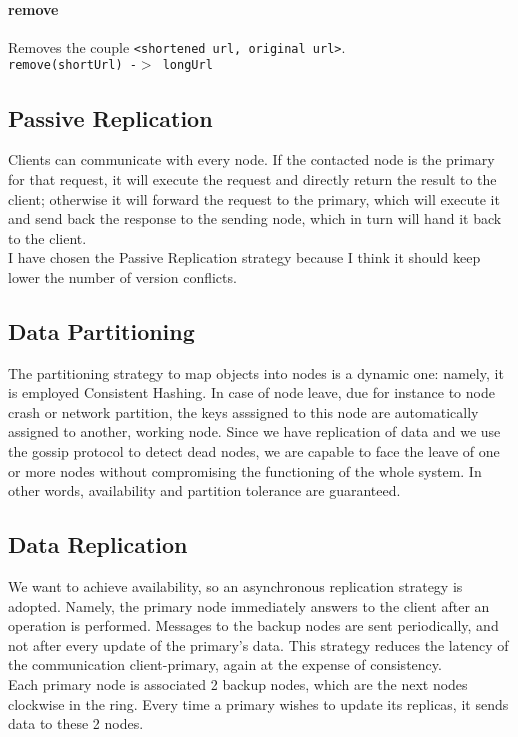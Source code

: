 \documentclass{article}
\begin{document}
\paragraph{remove}
Removes the couple \texttt{<shortened url, original url>}.\\
\texttt{remove(shortUrl) -$>$  longUrl}


\subsection{Passive Replication}
Clients can communicate with every node. If the contacted node is the primary for that request, it will execute the request and directly return the result to the client; otherwise it will forward the request to the primary, which will execute it and send back the response to the sending node, which in turn will hand it back to the client. \\

I have chosen the Passive Replication strategy because I think it should keep lower the number of version conflicts.

\subsection{Data Partitioning}
The partitioning strategy to map objects into nodes is a dynamic one: namely, it is employed Consistent Hashing. In case of node leave, due for instance to node crash or network partition, the keys asssigned to this node are automatically assigned to another, working node. Since we have replication of data and we use the gossip protocol to detect dead nodes, we are capable to face the leave of one or more nodes without compromising the functioning of the whole system. In other words, availability and partition tolerance are guaranteed.

\subsection{Data Replication}
We want to achieve availability, so an asynchronous replication strategy is adopted. Namely, the primary node immediately answers to the client after an operation is performed. Messages to the backup nodes are sent periodically, and not after every update of the primary's data. This strategy reduces the latency of the communication client-primary, again at the expense of consistency. \\
Each primary node is associated 2 backup nodes, which are the next nodes clockwise in the ring. Every time a primary wishes to update its replicas, it sends data to these 2 nodes.
\end{document}
